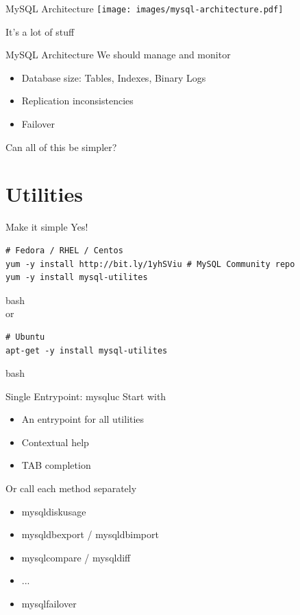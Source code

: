 \documentclass{beamer}[10]
\begin{document}
\begin{pyframe}{MySQL Architecture}
\texttt{[image: images/mysql-architecture.pdf]}
{\large
\begin{center}
It's a lot of stuff
\end{center}
}
\end{pyframe}


\begin{pyframe}{MySQL Architecture}
We should manage and monitor
\begin{itemize}
\item Database size: Tables, Indexes, Binary Logs
\item Replication inconsistencies
\item Failover
\end{itemize}
Can all of this be simpler?
\end{pyframe}

\section{Utilities}
\begin{pyframe}{Make it simple}
Yes!

\begin{verbatim}
# Fedora / RHEL / Centos
yum -y install http://bit.ly/1yhSViu # MySQL Community repo
yum -y install mysql-utilites
\end{verbatim}{bash}
\\or\\
\begin{verbatim}
# Ubuntu
apt-get -y install mysql-utilites
\end{verbatim}{bash}
\end{pyframe}


\begin{pyframe}{Single Entrypoint: mysqluc}
Start with 
\begin{itemize}
\item An entrypoint for all utilities
\item Contextual help
\item TAB completion
\end{itemize}
Or call each method separately
\begin{itemize}
\item mysqldiskusage
\item mysqldbexport / mysqldbimport
\item mysqlcompare / mysqldiff
\item ...
\item mysqlfailover
\end{itemize}
\end{pyframe}
\end{document}
